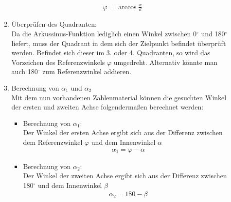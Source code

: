 \begin{itemize}
\begin{enumerate}
\begin{align*}
\varphi = \arccos \frac{x}{d}
\end{align*}
\item Überprüfen des Quadranten:\\
Da die Arkussinus-Funktion lediglich einen Winkel zwischen 0$^\circ$ und 180$^\circ$ liefert, muss der Quadrant in dem sich der Zielpunkt befindet überprüft werden. Befindet sich dieser im 3. oder 4. Quadranten, so wird das Vorzeichen des Referenzwinkels $\varphi$ umgedreht. Alternativ könnte man auch 180$^\circ$ zum Referenzwinkel addieren.
\item Berechnung von $\alpha_1$ und $\alpha_2$\\
Mit dem nun vorhandenen Zahlenmaterial können die gesuchten Winkel der ersten und zweiten Achse folgendermaßen berechnet werden:
\begin{itemize}
\item Berechnung von $\alpha_1$:\\
Der Winkel der ersten Achse ergibt sich aus der Differenz zwischen dem Referenzwinkel $\varphi$ und dem Innenwinkel $\alpha$
\begin{align*}
\alpha_1 = \varphi - \alpha
\end{align*}
\item Berechnung von $\alpha_2$:\\
Der Winkel der zweiten Achse ergibt sich aus der Differenz zwischen 180$^\circ$ und dem Innenwinkel $\beta$
\begin{align*}
\alpha_2 = 180 - \beta
\end{align*}
\end{itemize}

\end{enumerate}
\end{itemize}